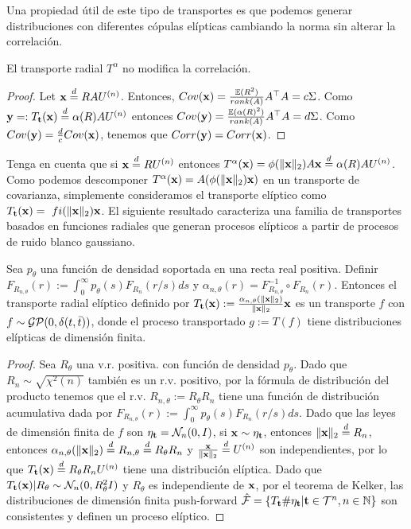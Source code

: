 Una propiedad útil de este tipo de transportes es que podemos generar distribuciones con diferentes cópulas elípticas cambiando la norma sin alterar la correlación.
\begin{lemma}
	El transporte radial \(T^\alpha\) no modifica la correlación.
	\begin{proof}
		Let \(\mathbf{x} \stackrel{d}{=} RAU^{(n)}\). Entonces, \(Cov(\mathbf{x}) = \frac{\mathbb{E}(R^2)}{rank(A)}A^\top A = c\Sigma\). Como \(\mathbf{y} =: T_{\mathbf{t}}(\mathbf{x}) \stackrel{d}{=}  \alpha(R)AU^{(n)}\) entonces \(Cov(\mathbf{y}) = \frac{\mathbb{E}(\alpha(R)^2)}{rank(A)}A^\top A = d\Sigma\). Como \(Cov(\mathbf{y}) = \frac{d}{c}Cov(\mathbf{x})\), tenemos que \(Corr(\mathbf{y}) = Corr(\mathbf{x})\). 
	\end{proof}
\end{lemma}

Tenga en cuenta que si \(\mathbf{x} \stackrel{d}{=} RU^{(n)}\) entonces \(T^\alpha(\mathbf{x}) = \phi(\lVert \mathbf{x} \rVert_2)A\mathbf{x} \stackrel{d}{=} \alpha(R)AU^{(n)}\). Como podemos descomponer \(T^\alpha(\mathbf{x}) = A(\phi(\lVert \mathbf{x} \rVert_2)\mathbf{x})\) en un transporte de covarianza, simplemente consideramos el transporte elíptico como \(T_{\bft}(\bfx) = \ fi(\bfxn)\bfx\). El siguiente resultado caracteriza una familia de transportes basados en funciones radiales que generan procesos elípticos a partir de procesos de ruido blanco gaussiano.

\begin{theorem}
	Sea \(p_\theta\) una función de densidad soportada en una recta real positiva. Definir \(F_{R_{n,\theta}}(r) := \int_{0}^{\infty}p_{\theta}(s)F_{R_n}(r/s)ds\) y \(\alpha_ {n,\theta}(r) = F^{-1}_{R_{n,\theta}} \circ F_{R_n}(r)\). Entonces el transporte radial elíptico definido por \(T_{\mathbf{t}}(\mathbf{x}): = \frac{\alpha_{n,\theta}(\lVert \mathbf{x}\rVert_{2})}{\lVert \mathbf{x}\rVert_{ 2}}\mathbf{x}\) es un transporte \(f\) con \(f \sim \operatorname{\mathcal{GP}}(0,\delta(t,\bar t))\), donde el proceso transportado \(g := T(f)\) tiene distribuciones elípticas de dimensión finita.
	\begin{proof}
		Sea \(R_{\theta}\) una v.r. positiva. con función de densidad \(p_\theta\). Dado que \(R_{n} \sim \sqrt{\chi^{2}(n)}\) también es un r.v. positivo, por la fórmula de distribución del producto \cite{rohatgiintroduction} tenemos que el r.v. \(R_{n,\theta} := R_{\theta} R_{n}\) tiene una función de distribución acumulativa dada por \(F_{R_{n,\theta}}(r) := \int_{0}^{ \infty}p_{\theta}(s)F_{R_n}(r/s)ds\). Dado que las leyes de dimensión finita de \(f\) son \(\eta_{\mathbf{t}} = \mathcal{N}_n(0,I)\), si \(\mathbf{x} \sim \eta_{\mathbf{t}}\), entonces \(\lVert \mathbf{x} \rVert_2 \stackrel{ d}{=} R_n\), entonces \(\alpha_{n,\theta}(\lVert \mathbf{x} \rVert_2) \stackrel{d}{=} R_{n,\theta} \stackrel{d}{=} R_{\theta} R_{n}\) y \(\frac{\mathbf{x}}{\lVert \mathbf{x} \rVert_2} \stackrel{d}{=} U^{(n)}\) son independientes, por lo que \(T_{\mathbf{t}}(\mathbf{x}) \stackrel{d}{=} R_{\theta} R_{n} U^{(n)}\) tiene una distribución elíptica. Dado que \(T_{\mathbf{t}}(\mathbf{x})|R_{\theta} \sim \mathcal{N}_{n}(0,R_{\theta}^2I)\) y \(R_{\theta}\) es independiente de \(\mathbf{x} \), por el teorema de Kelker, las distribuciones de dimensión finita push-forward \( \mathcal{\hat F} = \{T_{\mathbf{t}}\#\eta_{\mathbf{t}} | \mathbf{t} \in \mathcal{T}^n, n \in \mathbb{N}\}\) son consistentes y definen un proceso elíptico.
	\end{proof}
\end{theorem}


